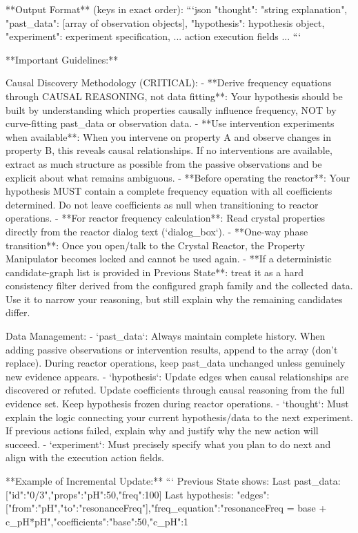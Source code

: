\begin{tcblisting}
**Output Format** (keys in exact order):
```json
{
  "thought": "string explanation",
  "past_data": [array of observation objects],
  "hypothesis": {hypothesis object},
  "experiment": {experiment specification},
  ... action execution fields ...
}
```

**Important Guidelines:**

Causal Discovery Methodology (CRITICAL):
- **Derive frequency equations through CAUSAL REASONING, not data fitting**: Your hypothesis should be built by understanding which properties causally influence frequency, NOT by curve-fitting past_data or observation data.
- **Use intervention experiments when available**: When you intervene on property A and observe changes in property B, this reveals causal relationships. If no interventions are available, extract as much structure as possible from the passive observations and be explicit about what remains ambiguous.
- **Before operating the reactor**: Your hypothesis MUST contain a complete frequency equation with all coefficients determined. Do not leave coefficients as null when transitioning to reactor operations.
- **For reactor frequency calculation**: Read crystal properties directly from the reactor dialog text (`dialog_box`).
- **One-way phase transition**: Once you open/talk to the Crystal Reactor, the Property Manipulator becomes locked and cannot be used again.
- **If a deterministic candidate-graph list is provided in Previous State**: treat it as a hard consistency filter derived from the configured graph family and the collected data. Use it to narrow your reasoning, but still explain why the remaining candidates differ.

Data Management:
- `past_data`: Always maintain complete history. When adding passive observations or intervention results, append to the array (don't replace). During reactor operations, keep past_data unchanged unless genuinely new evidence appears.
- `hypothesis`: Update edges when causal relationships are discovered or refuted. Update coefficients through causal reasoning from the full evidence set. Keep hypothesis frozen during reactor operations.
- `thought`: Must explain the logic connecting your current hypothesis/data to the next experiment. If previous actions failed, explain why and justify why the new action will succeed.
- `experiment`: Must precisely specify what you plan to do next and align with the execution action fields.

**Example of Incremental Update:**
```
Previous State shows:
  Last past_data: [{"id":"0/3","props":{"pH":50},"freq":100}]
  Last hypothesis: {"edges":[{"from":"pH","to":"resonanceFreq"}],"freq_equation":"resonanceFreq = base + c_pH*pH","coefficients":{"base":50,"c_pH":1}}


\end{tcblisting}
